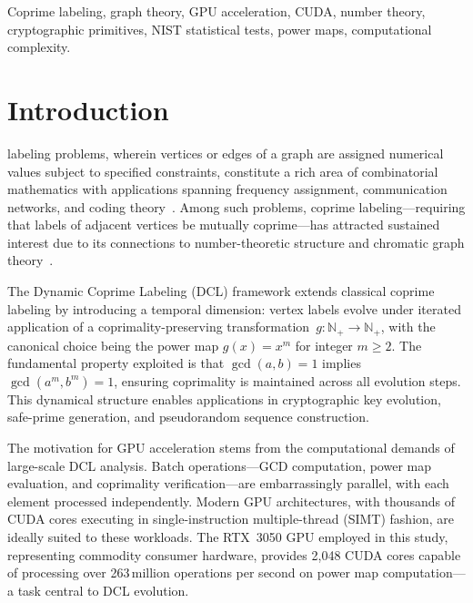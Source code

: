 \documentclass[lettersize,journal]{IEEEtran}
\begin{document}
\begin{IEEEkeywords}
Coprime labeling, graph theory, GPU acceleration, CUDA, number theory, cryptographic primitives, NIST statistical tests, power maps, computational complexity.
\end{IEEEkeywords}

\section{Introduction}
\label{sec:intro}

 labeling problems, wherein vertices or edges of a graph are assigned numerical values subject to specified constraints, constitute a rich area of combinatorial mathematics with applications spanning frequency assignment, communication networks, and coding theory~\cite{gallian2021}. Among such problems, coprime labeling---requiring that labels of adjacent vertices be mutually coprime---has attracted sustained interest due to its connections to number-theoretic structure and chromatic graph theory~\cite{bondy2008}.

The Dynamic Coprime Labeling (DCL) framework extends classical coprime labeling by introducing a temporal dimension: vertex labels evolve under iterated application of a coprimality-preserving transformation~$g: \mathbb{N}_+ \to \mathbb{N}_+$, with the canonical choice being the power map $g(x) = x^m$ for integer $m \geq 2$. The fundamental property exploited is that $\gcd(a,b) = 1$ implies $\gcd(a^m, b^m) = 1$, ensuring coprimality is maintained across all evolution steps. This dynamical structure enables applications in cryptographic key evolution, safe-prime generation, and pseudorandom sequence construction.

The motivation for GPU acceleration stems from the computational demands of large-scale DCL analysis. Batch operations---GCD computation, power map evaluation, and coprimality verification---are embarrassingly parallel, with each element processed independently. Modern GPU architectures, with thousands of CUDA cores executing in single-instruction multiple-thread (SIMT) fashion, are ideally suited to these workloads. The RTX~3050 GPU employed in this study, representing commodity consumer hardware, provides 2{,}048 CUDA cores capable of processing over 263\,million operations per second on power map computation---a task central to DCL evolution.
\end{document}
